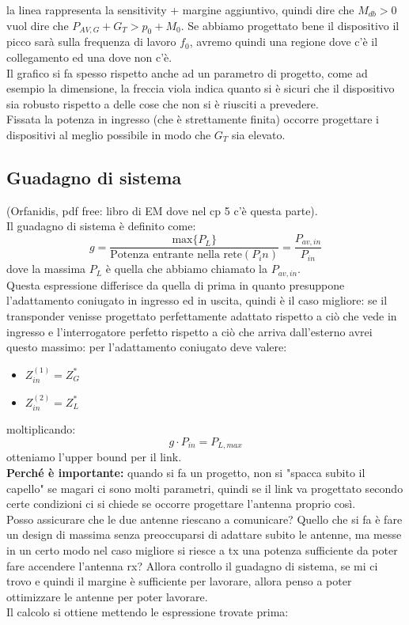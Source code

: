 \documentclass[oneside, 12pt]{extbook}
\begin{document}
la linea rappresenta la sensitivity + margine aggiuntivo, quindi dire che $M_{db} > 0$ vuol dire che $P_{AV,G} + G_T > p_0 + M_0$. Se abbiamo progettato bene il dispositivo il picco sarà sulla frequenza di lavoro $f_0$, avremo quindi una regione dove c'è il collegamento ed una dove non c'è.\\Il grafico si fa spesso rispetto anche ad un parametro di progetto, come ad esempio la dimensione, la freccia viola indica quanto si è sicuri che il dispositivo sia robusto rispetto a delle cose che non si è riusciti a prevedere.\\Fissata la potenza in ingresso (che è strettamente finita) occorre progettare i dispositivi al meglio possibile in modo che $G_T$ sia elevato.

\subsection{Guadagno di sistema}
(Orfanidis, pdf free: libro di EM dove nel cp 5 c'è questa parte).\\Il guadagno di sistema è definito come:
\begin{equation}
	g = \dfrac{\text{max}\{P_L\}}{\text{Potenza entrante nella rete} (P_in)} = \frac{P_{av,in}}{P_{in}}
\end{equation}
dove la massima $P_L$ è quella che abbiamo chiamato la $P_{av,in}$.\\Questa espressione differisce da quella di prima in quanto presuppone l'adattamento coniugato in ingresso ed in uscita, quindi è il caso migliore: se il transponder venisse progettato perfettamente adattato rispetto a ciò che vede in ingresso e l'interrogatore perfetto rispetto a ciò che arriva dall'esterno avrei questo massimo: per l'adattamento coniugato deve valere:
\begin{itemize}
	\item $Z_{in}^{(1)} = Z_{G}^*$
	\item $Z_{in}^{(2)} = Z_{L}^*$
\end{itemize}
moltiplicando: 
\begin{equation}
	g \cdot P_{in} = P_{L,max}
\end{equation}
otteniamo l'upper bound per il link.\\ \textbf{Perché è importante:} quando si fa un progetto, non si "spacca subito il capello" se magari ci sono molti parametri, quindi se il link va progettato secondo certe condizioni ci si chiede se occorre progettare l'antenna proprio così.\\Posso assicurare che le due antenne riescano a comunicare? Quello che si fa è fare un design di massima senza preoccuparsi di adattare subito le antenne, ma messe in un certo modo nel caso migliore si riesce a tx una potenza sufficiente da poter fare accendere l'antenna rx? Allora controllo il guadagno di sistema, se mi ci trovo e quindi il margine è sufficiente per lavorare, allora penso a poter ottimizzare le antenne per poter lavorare.\\Il calcolo si ottiene mettendo le espressione trovate prima:
\end{document}
